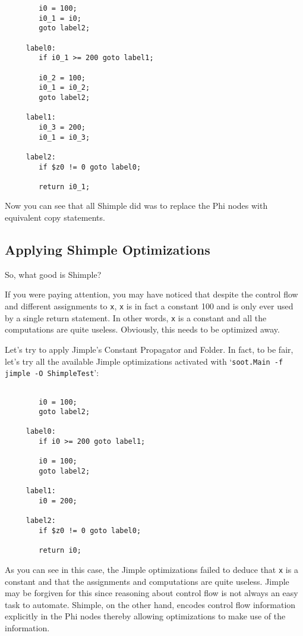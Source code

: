 \documentclass[10pt,letterpaper,oneside,onecolumn]{article}
\begin{document}
\begin{verbatim}
        i0 = 100;
        i0_1 = i0;
        goto label2;

     label0:
        if i0_1 >= 200 goto label1;

        i0_2 = 100;
        i0_1 = i0_2;
        goto label2;

     label1:
        i0_3 = 200;
        i0_1 = i0_3;

     label2:
        if $z0 != 0 goto label0;

        return i0_1;
\end{verbatim}

Now you can see that all Shimple did was to replace the Phi nodes
with equivalent copy statements.

\subsection{Applying Shimple Optimizations}

So, what good is Shimple?  

If you were paying attention, you may have noticed that despite the
control flow and different assignments to {\tt x}, {\tt x} is in fact
a constant 100 and is only ever used by a single return statement.  In
other words, {\tt x} is a constant and all the computations are quite
useless.  Obviously, this needs to be optimized away.

Let's try to apply Jimple's Constant Propagator and Folder.  In fact,
to be fair, let's try all the available  Jimple optimizations activated
with `{\tt soot.Main -f jimple -O ShimpleTest}':

\begin{verbatim}

        i0 = 100;
        goto label2;

     label0:
        if i0 >= 200 goto label1;

        i0 = 100;
        goto label2;

     label1:
        i0 = 200;

     label2:
        if $z0 != 0 goto label0;

        return i0;
\end{verbatim}

As you can see in this case, the Jimple optimizations failed to deduce
that {\tt x} is a constant and that the assignments and computations
are quite useless.  Jimple may be forgiven for this since reasoning
about control flow is not always an easy task to automate.  Shimple,
on the other hand, encodes control flow information explicitly in the
Phi nodes thereby allowing optimizations to make use of the
information.
\end{document}
